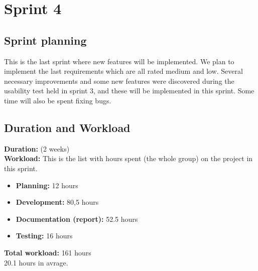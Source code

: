 \section{Sprint 4}

\subsection{Sprint planning}

	This is the last sprint where new features will be implemented. We plan to implement the last 
	requirements which are all rated medium and low. Several necessary improvements and some new 
	features were discovered during the usability test held in sprint 3, and these will be implemented 
	in this sprint. Some time will also be spent fixing bugs.

\subsection{Duration and Workload}

{\bf Duration:}  (2 weeks)\\
	{\bf Workload:} This is the list with hours spent (the whole group) on the project in this sprint.
	\begin{itemize}
		\item {\bf Planning:}  12 hours
		\item {\bf Development:}  80,5 hours
		\item {\bf Documentation (report):} 52.5 hours
		\item {\bf Testing:} 16 hours
	\end{itemize}
	{\bf Total workload: }  161 hours \\

	20.1 hours in avrage. 

\clearpage
